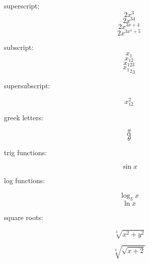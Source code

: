 \documentclass[10pt]{article}
\begin{document}
superscript: $$2x^3$$
$$2x^{34}$$
$$2x^{3x+4}$$
$$2x^{3x^4+5}$$

subscript: 
$$x_1$$
$$x_{12}$$
$$x_{123}$$
$${{x_1}_2}_3$$

supersubscript: 

$$x_{12}^2$$

greek letters: 

$$\pi$$
$$\alpha$$
$$\theta$$ 

trig functions: 

$$\sin{x}$$

log functions: 

$$\log_3{x}$$
$$\ln{x}$$

square roots: 

$$\sqrt[3]{x^2+y^2}$$

$$\sqrt[4]{\sqrt{x+2}}$$
\end{document}
